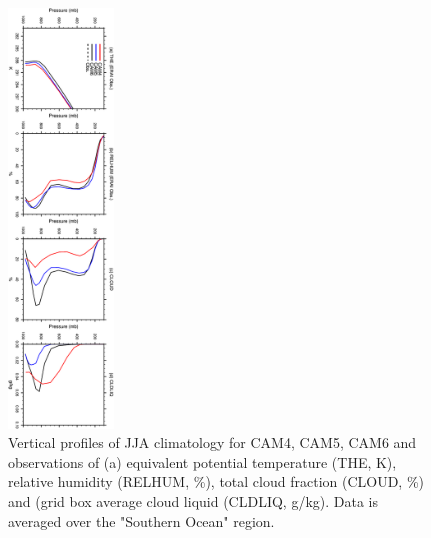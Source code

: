 \clearpage
\begin{figure}[t]
  \begin{center}
    \includegraphics[width=0.25\textwidth,angle=90.]{./figs/f_vprof_socn_JJA.pdf}
  \end{center}
  \caption{Vertical profiles of JJA climatology for CAM4, CAM5, CAM6 and observations of (a) equivalent potential temperature (THE, K), relative humidity (RELHUM, \%), total cloud fraction (CLOUD, \%) and (grid box average cloud liquid (CLDLIQ, g/kg). Data is averaged over the "Southern Ocean" region.} 
\label{f_vprof_socn_JJA}
\end{figure} 


